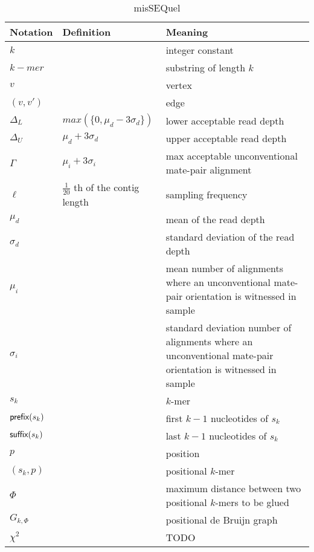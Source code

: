 \documentclass{article}
\begin{document}
\begin{table}
  \begin{tabularx}{\textwidth}{|l|X|X|}
    \hline
    Notation & Definition  & Meaning \\ \hline
    \hline
    \hline
    $k$ & & integer constant\\ \hline
    $k-mer$ & & substring of length $k$\\ \hline
    $v$ & & vertex \\ \hline
    $(v, v')$ & & edge \\ \hline
    $\Delta_L$ & $max(\{0, \mu_d - 3\sigma_d\})$ & lower acceptable read depth \\ \hline
    $\Delta_U$ & $\mu_d + 3\sigma_d$ & upper acceptable read depth \\ \hline
    $\Gamma$ & $\mu_i + 3\sigma_i$ & max acceptable unconventional mate-pair alignment  \\ \hline
    $\ell$ & $\frac{1}{20}$ th of the contig length & sampling frequency \\ \hline
    $\mu_{d}$ & & mean of the read depth\\ \hline
    $\sigma_d$ & & standard deviation of the read depth\\ \hline
    $\mu_{i}$ & & mean number of alignments where an unconventional mate-pair orientation is witnessed in sample \\ \hline
    $\sigma_i$ & & standard deviation number of alignments where an unconventional mate-pair orientation is witnessed in sample \\ \hline
    $s_k$ & & $k$-mer \\ \hline
    $\mbox{\rm {\sf prefix}}(s_k)$ & & first $k - 1$ nucleotides of $s_k$ \\ \hline
    $\mbox{\rm {\sf suffix}}(s_k)$ & &  last $k - 1$ nucleotides of $s_k$ \\ \hline
    $p$ & & position \\ \hline
    $(s_k, p)$ & & positional $k$-mer \\ \hline
    $\Phi$ & & maximum distance between two positional $k$-mers to be glued \\ \hline
    $G_{k, \Phi}$ & & positional de Bruijn graph \\ \hline
    $\chi^2$ & & TODO \\ \hline
    \hline
  \end{tabularx}
  \caption{misSEQuel}
\end{table}
\end{document}
